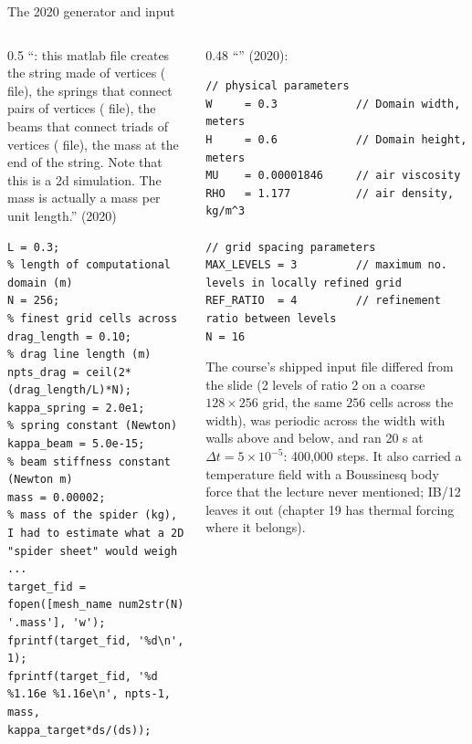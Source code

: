 \documentclass[aspectratio=169,11pt]{beamer}
\begin{document}
\begin{frame}[fragile]{The 2020 generator and input}
\label{fr:gen2020}
\begin{columns}[T,onlytextwidth]
\begin{column}{0.5\textwidth}
\small ``: this matlab file creates the string made of vertices ( file), the springs that connect pairs of vertices ( file), the beams that connect triads of vertices ( file), the mass at the end of the string. Note that this is a 2d simulation. The mass is actually a mass per unit length.'' (2020)
\begin{lstlisting}[style=matlabtiny]
L = 0.3;                      % length of computational domain (m)
N = 256;                      % finest grid cells across
drag_length = 0.10;           % drag line length (m)
npts_drag = ceil(2*(drag_length/L)*N);
kappa_spring = 2.0e1;         % spring constant (Newton)
kappa_beam = 5.0e-15;         % beam stiffness constant (Newton m)
mass = 0.00002;               % mass of the spider (kg), I had to estimate what a 2D "spider sheet" would weigh
...
target_fid = fopen([mesh_name num2str(N) '.mass'], 'w');
fprintf(target_fid, '%d\n', 1);
fprintf(target_fid, '%d %1.16e %1.16e\n', npts-1, mass, kappa_target*ds/(ds));
\end{lstlisting}
\end{column}
\begin{column}{0.48\textwidth}
\small ``'' (2020):
\begin{lstlisting}[style=inputtiny]
// physical parameters
W     = 0.3            // Domain width, meters
H     = 0.6            // Domain height, meters
MU    = 0.00001846     // air viscosity
RHO   = 1.177          // air density, kg/m^3

// grid spacing parameters
MAX_LEVELS = 3         // maximum no. levels in locally refined grid
REF_RATIO  = 4         // refinement ratio between levels
N = 16
\end{lstlisting}
\footnotesize The course's shipped input file differed from the slide (2 levels of ratio 2 on a coarse $128\times256$ grid, the same $256$ cells across the width), was periodic across the width with walls above and below, and ran 20 s at $\Delta t = 5\times10^{-5}$: 400,000 steps. It also carried a temperature field with a Boussinesq body force that the lecture never mentioned; IB/12 leaves it out (chapter 19 has thermal forcing where it belongs).
\end{column}
\end{columns}
\end{frame}
\end{document}
